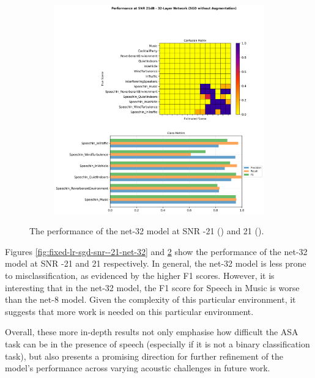\documentclass[logo,bsc,singlespacing,parskip,online]{infthesis}
\begin{document}
\begin{figure}[h]
\begin{subfigure}[b]{0.48\textwidth}
      \includegraphics[width=\textwidth]{net-32/FIXED-fixed-lr-sgd/snr_21_performance.png}
      \caption{}
      \label{fig:fixed-lr-sgd-snr-21-net-32}
   \end{subfigure}
   \caption{The performance of the net-32 model at SNR -21 () and 21 ().}
\end{figure}

Figures \ref{fig:fixed-lr-sgd-snr--21-net-32} and \ref{fig:fixed-lr-sgd-snr-21-net-32} show 
the performance of the net-32 model at SNR -21 and 21 respectively.
In general, the net-32 model is less prone to misclassification, 
as evidenced by the higher F1 scores. However, it is interesting that in the 
net-32 model, the F1 score for Speech in Music is worse than the net-8 model.
Given the complexity of this particular environment, it suggests that 
more work is needed on this particular environment. 

Overall, these more in-depth results not only emphasise 
how difficult the ASA task can be in the presence of speech (especially 
if it is not a binary classification task), but also 
presents a promising direction for further refinement of the model's performance across varying acoustic challenges
in future work.
\end{document}
